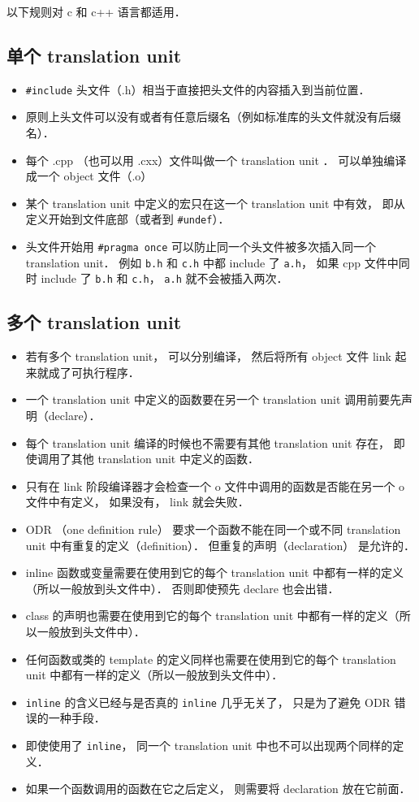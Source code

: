 
以下规则对 c 和 c++ 语言都适用．

\subsection{单个 translation unit}
\begin{itemize}
\item \verb|#include| 头文件（.h）相当于直接把头文件的内容插入到当前位置．
\item 原则上头文件可以没有或者有任意后缀名（例如标准库的头文件就没有后缀名）．
\item 每个 .cpp （也可以用 .cxx）文件叫做一个 translation unit ． 可以单独编译成一个 object 文件（.o）
\item 某个 translation unit 中定义的宏只在这一个 translation unit 中有效， 即从定义开始到文件底部（或者到 \verb|#undef|）．
\item 头文件开始用 \verb|#pragma once| 可以防止同一个头文件被多次插入同一个 translation unit． 例如 \verb|b.h| 和 \verb|c.h| 中都 include 了 \verb|a.h|， 如果 cpp 文件中同时 include 了 \verb|b.h| 和 \verb|c.h|， \verb|a.h| 就不会被插入两次．
\end{itemize}

\subsection{多个  translation unit}
\begin{itemize}
\item 若有多个 translation unit， 可以分别编译， 然后将所有 object 文件 link 起来就成了可执行程序．
\item 一个 translation unit 中定义的函数要在另一个 translation unit 调用前要先声明（declare）．
\item 每个 translation unit 编译的时候也不需要有其他 translation unit 存在， 即使调用了其他 translation unit 中定义的函数．
\item 只有在 link 阶段编译器才会检查一个 o 文件中调用的函数是否能在另一个 o 文件中有定义， 如果没有， link 就会失败．
\item ODR （one definition rule） 要求一个函数不能在同一个或不同 translation unit 中有重复的定义（definition）． 但重复的声明（declaration） 是允许的．
\item inline 函数或变量需要在使用到它的每个 translation unit 中都有一样的定义（所以一般放到头文件中）． 否则即使预先 declare 也会出错．
\item class 的声明也需要在使用到它的每个 translation unit 中都有一样的定义（所以一般放到头文件中）．
\item 任何函数或类的 template 的定义同样也需要在使用到它的每个 translation unit 中都有一样的定义（所以一般放到头文件中）．
\item \verb|inline| 的含义已经与是否真的 \verb|inline| 几乎无关了， 只是为了避免 ODR 错误的一种手段．
\item 即使使用了 \verb|inline|， 同一个 translation unit 中也不可以出现两个同样的定义．
\item 如果一个函数调用的函数在它之后定义， 则需要将 declaration 放在它前面．
\end{itemize}
